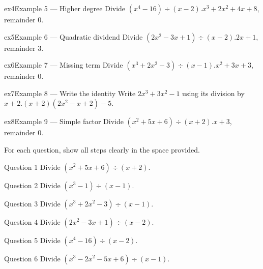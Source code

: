 \documentclass[11pt]{article}
\begin{document}
\begin{example}{ex4}{Example 5 --- Higher degree}
Divide $(x^4-16)\div(x-2)$.\soln $x^3+2x^2+4x+8$, remainder $0$.
\end{example}

\begin{example}{ex5}{Example 6 --- Quadratic dividend}
Divide $(2x^2-3x+1)\div(x-2)$.\soln $2x+1$, remainder $3$.
\end{example}

\begin{example}{ex6}{Example 7 --- Missing term}
Divide $(x^3+2x^2-3)\div(x-1)$.\soln $x^2+3x+3$, remainder $0$.
\end{example}

\begin{example}{ex7}{Example 8 --- Write the identity}
Write $2x^3+3x^2-1$ using its division by $x+2$.\soln $(x+2)(2x^2-x+2)-5$.
\end{example}

\begin{example}{ex8}{Example 9 --- Simple factor}
Divide $(x^2+5x+6)\div(x+2)$.\soln $x+3$, remainder $0$.
\end{example}

\clearpage
{}
For each question, show all steps clearly in the space provided.

\begin{qbox}{Question 1}
Divide $(x^2+5x+6)\div(x+2)$.\workspace{2.4cm}
\end{qbox}

\begin{qbox}{Question 2}
Divide $(x^3-1)\div(x-1)$.\workspace{2.4cm}
\end{qbox}

\begin{qbox}{Question 3}
Divide $(x^3+2x^2-3)\div(x-1)$.\workspace{2.4cm}
\end{qbox}

\begin{qbox}{Question 4}
Divide $(2x^2-3x+1)\div(x-2)$.\workspace{2.4cm}
\end{qbox}

\begin{qbox}{Question 5}
Divide $(x^4-16)\div(x-2)$.\workspace{2.4cm}
\end{qbox}

\begin{qbox}{Question 6}
Divide $(x^3-2x^2-5x+6)\div(x-1)$.\workspace{2.4cm}
\end{qbox}
\end{document}
